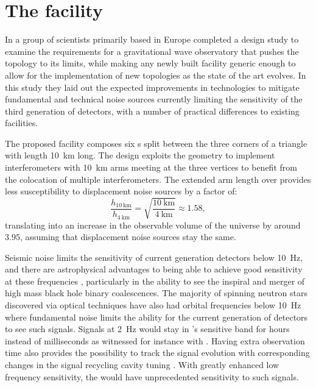\section{The \ET{} facility}
In  a group of scientists primarily based in Europe completed a design study \cite{ET2011} to examine the requirements for a gravitational wave observatory that pushes the \MI{} topology to its limits, while making any newly built facility generic enough to allow for the implementation of new topologies as the state of the art evolves. In this study they laid out the expected improvements in technologies to mitigate fundamental and technical noise sources currently limiting the sensitivity of the third generation of detectors, with a number of practical differences to existing facilities.

The proposed \ET{} facility composes six \DRFPMI{}s split between the three corners of a triangle with length \SI{10}{\kilo\meter} long. The design exploits the geometry to implement interferometers with \SI{10}{\kilo\meter} arms meeting at the three vertices to benefit from the colocation of multiple interferometers. The extended arm length over \ALIGO{} provides less susceptibility to displacement noise sources \cite{Dwyer2015, aligocosmic2016} by a factor of:
\begin{equation}
  \frac{h_{\SI{10}{\kilo\meter}}}{h_{\SI{4}{\kilo\meter}}} = \sqrt{\frac{\SI{10}{\kilo\meter}}{\SI{4}{\kilo\meter}}} \approx 1.58,
\end{equation}
translating into an increase in the observable volume of the universe by around $3.95$, assuming that displacement noise sources stay the same.

Seismic noise limits the sensitivity of current generation detectors below \SI{10}{\hertz}, and there are astrophysical advantages to being able to achieve good sensitivity at these frequencies \cite{Sathyaprakash2012}, particularly in the ability to see the inspiral and merger of high mass black hole binary coalescences. The majority of spinning neutron stars discovered via optical techniques have also had orbital frequencies below \SI{10}{\hertz} where fundamental noise limits the ability for the current generation of detectors to see such signals. Signals at \SI{2}{\hertz} would stay in \ETLF{}'s sensitive band for hours instead of milliseconds as witnessed for instance with \GWFIRSTEVENT{} \cite{Abbott2016}. Having extra observation time also provides the possibility to track the signal evolution with corresponding changes in the signal recycling cavity tuning \cite{Heinzel2002, Simakov2014}. With greatly enhanced low frequency sensitivity, the \ET{} would have unprecedented sensitivity to such signals.

